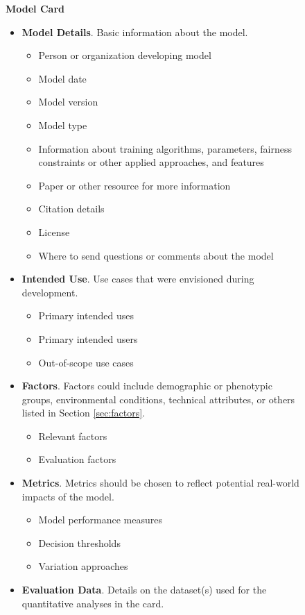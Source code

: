 \begin{figure}
\begin{framed}
{\Large {\bf Model Card}}
\begin{itemize}[leftmargin=*]
\item {\bf Model Details}.  Basic information about the model.
\begin{itemize}
\item Person or organization developing model
\item Model date
\item Model version
\item Model type
\item Information about training algorithms, parameters, fairness constraints or other applied approaches, and features
\item Paper or other resource for more information
\item Citation details
\item License
\item Where to send questions or comments about the model \end{itemize}
\item {\bf Intended Use}.  Use cases that were envisioned during development. 
\begin{itemize}
\item Primary intended uses
\item Primary intended users
\item Out-of-scope use cases
\end{itemize}
\item {\bf Factors}.  Factors could include demographic or phenotypic groups, environmental conditions, technical attributes, or others listed in Section \ref{sec:factors}.  
\begin{itemize}
\item Relevant factors
\item Evaluation factors
\end{itemize}
\item {\bf Metrics}.  Metrics should be chosen to reflect potential real-world impacts of the model.
\begin{itemize}
\item Model performance measures
\item Decision thresholds
\item Variation approaches
\end{itemize}
\item {\bf Evaluation Data}.  Details on the dataset(s) used for the quantitative analyses in the card.

\end{itemize}
\end{framed}
\end{figure}
